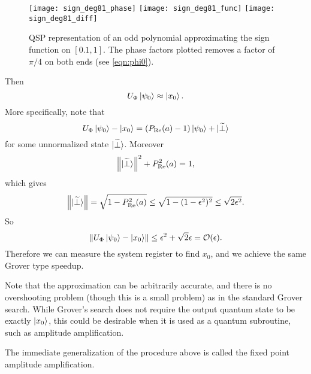 \begin{figure}[H]
\begin{center}
\texttt{[image: sign\_deg81\_phase]}
\texttt{[image: sign\_deg81\_func]}
\texttt{[image: sign\_deg81\_diff]}
\end{center}
\caption{QSP representation of an odd polynomial approximating the sign function on $[0.1,1]$. The phase factors plotted removes a factor of $\pi/4$ on both ends (see \cref{eqn:phi0}).}
\label{fig:qsp_sign_deg81}
\end{figure}
 



Then
\begin{equation}
U_{\Phi}\ket{\psi_0}\approx \ket{x_0}.
\end{equation}
More specifically, note that
\begin{equation}
U_{\Phi}\ket{\psi_0} - \ket{x_0}=(P_{\operatorname{Re}}(a)-1)\ket{\psi_0}+\ket{\widetilde{\perp}}
\end{equation}
for some unnormalized state $\ket{\widetilde{\perp}}$. Moreover
\begin{equation}
\left\lVert\ket{\widetilde{\perp}}\right\rVert^2+P_{\operatorname{Re}}^2(a)=1,
\end{equation}
which gives
\begin{equation}
\left\lVert\ket{\widetilde{\perp}}\right\rVert= \sqrt{1-P_{\operatorname{Re}}^2(a)}\le \sqrt{1-(1-\epsilon^{2})^2}\le \sqrt{2\epsilon^2}.
\end{equation}
So 
\begin{equation}
\left\lVert U_{\Phi}\ket{\psi_0} - \ket{x_0}\right\rVert\le \epsilon^2+\sqrt{2}\epsilon=\mathcal{O}(\epsilon).
\end{equation}
Therefore we can measure the system register to find $x_0$, and we achieve the same Grover type speedup.

Note that the approximation can be arbitrarily accurate, and there is no overshooting problem (though this is a small problem) as in the standard Grover search. 
While Grover's search does not require the output quantum state to be exactly $\ket{x_0}$, this could be desirable when it is used as a quantum subroutine, such as amplitude amplification.

The immediate generalization of the procedure above is called the fixed point amplitude amplification. 

